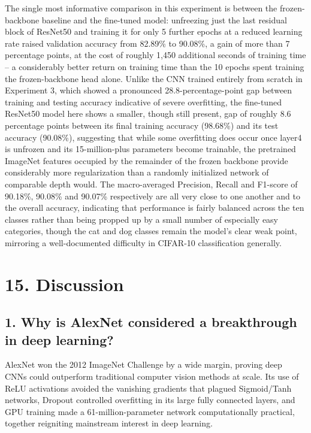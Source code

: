 \documentclass[11pt,a4paper]{article}
\begin{document}
The single most informative comparison in this experiment is between the frozen-backbone baseline and the fine-tuned model: unfreezing just the last residual block of ResNet50 and training it for only 5 further epochs at a reduced learning rate raised validation accuracy from 82.89\% to 90.08\%, a gain of more than 7 percentage points, at the cost of roughly 1,450 additional seconds of training time -- a considerably better return on training time than the 10 epochs spent training the frozen-backbone head alone. Unlike the CNN trained entirely from scratch in Experiment 3, which showed a pronounced 28.8-percentage-point gap between training and testing accuracy indicative of severe overfitting, the fine-tuned ResNet50 model here shows a smaller, though still present, gap of roughly 8.6 percentage points between its final training accuracy (98.68\%) and its test accuracy (90.08\%), suggesting that while some overfitting does occur once layer4 is unfrozen and its 15-million-plus parameters become trainable, the pretrained ImageNet features occupied by the remainder of the frozen backbone provide considerably more regularization than a randomly initialized network of comparable depth would. The macro-averaged Precision, Recall and F1-score of 90.18\%, 90.08\% and 90.07\% respectively are all very close to one another and to the overall accuracy, indicating that performance is fairly balanced across the ten classes rather than being propped up by a small number of especially easy categories, though the cat and dog classes remain the model's clear weak point, mirroring a well-documented difficulty in CIFAR-10 classification generally.

\section*{15. Discussion}

\subsection*{1. Why is AlexNet considered a breakthrough in deep learning?}

AlexNet won the 2012 ImageNet Challenge by a wide margin, proving deep CNNs could outperform traditional computer vision methods at scale. Its use of ReLU activations avoided the vanishing gradients that plagued Sigmoid/Tanh networks, Dropout controlled overfitting in its large fully connected layers, and GPU training made a 61-million-parameter network computationally practical, together reigniting mainstream interest in deep learning.
\end{document}
